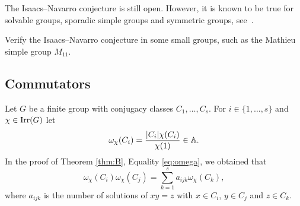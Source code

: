 The Isaacs--Navarro conjecture is still open. However, 
it is known to be true for solvable groups, 
sporadic simple groups and 
symmetric groups, see~\cite{MR1935849}. 









\begin{bonus}
Verify the Isaacs--Navarro conjecture in some small  groups, such as the Mathieu simple group $M_{11}$. 
\end{bonus}


\subsection{Commutators}
\label{commutators}

Let $G$ be a finite group with conjugacy classes $C_1,\dots,C_s$. For
$i\in\{1,\dots,s\}$ and $\chi\in\operatorname{Irr}(G)$ let  
\[
\omega_{\chi}(C_i)=\frac{|C_i|\chi(C_i)}{\chi(1)}\in\mathbb{A}.
\]
In the proof of Theorem \ref{thm:B}, Equality \eqref{eq:omega}, 
we obtained
that 
\begin{equation}
\label{eq:again_omega}
\omega_\chi(C_i)\omega_\chi(C_j)=\sum_{k=1}^sa_{ijk}\omega_{\chi}(C_k),
\end{equation}
where $a_{ijk}$ is the number of solutions 
of $xy=z$ with $x\in C_i$, $y\in C_j$ and $z\in C_k$. 

